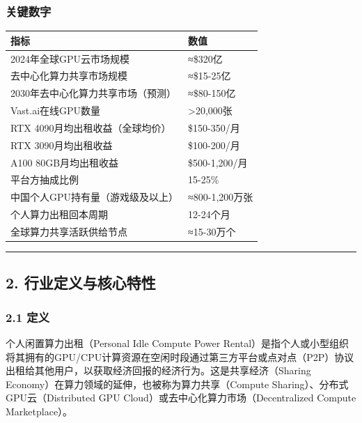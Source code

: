 \documentclass[UTF8,a4paper,12pt]{ctexart}
\begin{document}
\subsubsection{关键数字}\label{ux5173ux952eux6570ux5b57}

{\def\LTcaptype{none} %
\begin{longtable}[]{@{}ll@{}}
\toprule\noalign{}
指标 & 数值 \\
\midrule\noalign{}
\endhead
\bottomrule\noalign{}
\endlastfoot
2024年全球GPU云市场规模 & ≈\$320亿 \\
去中心化算力共享市场规模 & ≈\$15-25亿 \\
2030年去中心化算力共享市场（预测） & ≈\$80-150亿 \\
Vast.ai在线GPU数量 & \textgreater20,000张 \\
RTX 4090月均出租收益（全球均价） & \$150-350/月 \\
RTX 3090月均出租收益 & \$100-200/月 \\
A100 80GB月均出租收益 & \$500-1,200/月 \\
平台方抽成比例 & 15-25\% \\
中国个人GPU持有量（游戏级及以上） & ≈800-1,200万张 \\
个人算力出租回本周期 & 12-24个月 \\
全球算力共享活跃供给节点 & ≈15-30万个 \\
\end{longtable}
}

\begin{center}\rule{0.5\linewidth}{0.5pt}\end{center}

\pagebreak

\subsection{2.
行业定义与核心特性}\label{ux884cux4e1aux5b9aux4e49ux4e0eux6838ux5fc3ux7279ux6027}

\subsubsection{2.1 定义}\label{ux5b9aux4e49}

个人闲置算力出租（Personal Idle Compute Power
Rental）是指个人或小型组织将其拥有的GPU/CPU计算资源在空闲时段通过第三方平台或点对点（P2P）协议出租给其他用户，以获取经济回报的经济行为。这是共享经济（Sharing
Economy）在算力领域的延伸，也被称为算力共享（Compute
Sharing）、分布式GPU云（Distributed GPU
Cloud）或去中心化算力市场（Decentralized Compute Marketplace）。
\end{document}
